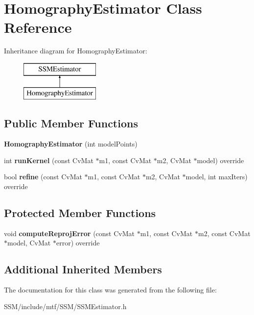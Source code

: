 \hypertarget{classHomographyEstimator}{\section{Homography\-Estimator Class Reference}
\label{classHomographyEstimator}
}
Inheritance diagram for Homography\-Estimator\-:\begin{figure}[H]
\begin{center}
\leavevmode
\includegraphics[height=2.000000cm]{classHomographyEstimator}
\end{center}
\end{figure}
\subsection*{Public Member Functions}
\begin{DoxyCompactItemize}
\item 
\hypertarget{classHomographyEstimator_a6b26d7a6060569953766b312a2fa057d}{{\bfseries Homography\-Estimator} (int model\-Points)}\label{classHomographyEstimator_a6b26d7a6060569953766b312a2fa057d}

\item 
\hypertarget{classHomographyEstimator_aaf252473e1eee30efe6bd716726992b5}{int {\bfseries run\-Kernel} (const Cv\-Mat $\ast$m1, const Cv\-Mat $\ast$m2, Cv\-Mat $\ast$model) override}\label{classHomographyEstimator_aaf252473e1eee30efe6bd716726992b5}

\item 
\hypertarget{classHomographyEstimator_a895f2ff605fb18992b6e4572bee51525}{bool {\bfseries refine} (const Cv\-Mat $\ast$m1, const Cv\-Mat $\ast$m2, Cv\-Mat $\ast$model, int max\-Iters) override}\label{classHomographyEstimator_a895f2ff605fb18992b6e4572bee51525}

\end{DoxyCompactItemize}
\subsection*{Protected Member Functions}
\begin{DoxyCompactItemize}
\item 
\hypertarget{classHomographyEstimator_a105943f40e59fd364b365b37e8ead5e8}{void {\bfseries compute\-Reproj\-Error} (const Cv\-Mat $\ast$m1, const Cv\-Mat $\ast$m2, const Cv\-Mat $\ast$model, Cv\-Mat $\ast$error) override}\label{classHomographyEstimator_a105943f40e59fd364b365b37e8ead5e8}

\end{DoxyCompactItemize}
\subsection*{Additional Inherited Members}


The documentation for this class was generated from the following file\-:\begin{DoxyCompactItemize}
\item 
S\-S\-M/include/mtf/\-S\-S\-M/S\-S\-M\-Estimator.\-h\end{DoxyCompactItemize}
